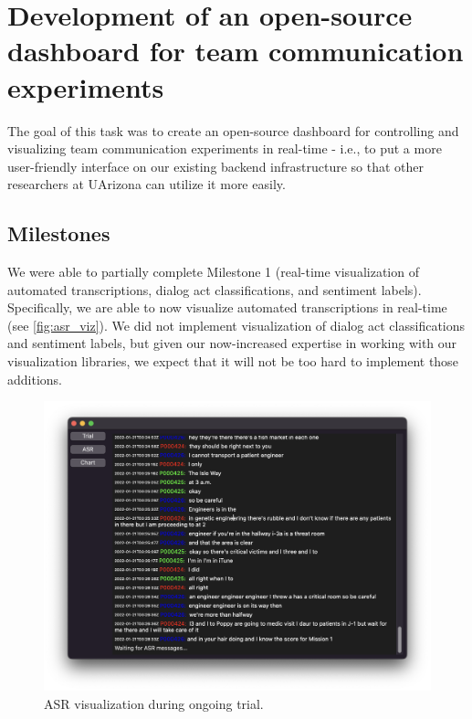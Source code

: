 \chapter{Development of an open-source dashboard for team communication experiments}
\label{ch:dashboard}

The goal of this task was to create an open-source dashboard for controlling
and visualizing team communication experiments in real-time - i.e., to put a
more user-friendly interface on our existing backend infrastructure so that
other researchers at UArizona can utilize it more easily.

\section{Milestones}

We were able to partially complete Milestone 1 (real-time visualization of
automated transcriptions, dialog act classifications, and sentiment labels).
Specifically, we are able to now visualize automated transcriptions in
real-time (see \autoref{fig:asr_viz}). 
We did not implement visualization of dialog act classifications and sentiment
labels, but given our now-increased expertise in working with our visualization
libraries, we expect that it will not be too hard to implement those additions. 


\begin{figure}
    \centering
    \includegraphics[width=\textwidth]{figures/asr_viz}
    \caption{ASR visualization during ongoing trial.}
    \label{fig:asr_viz}
\end{figure}


